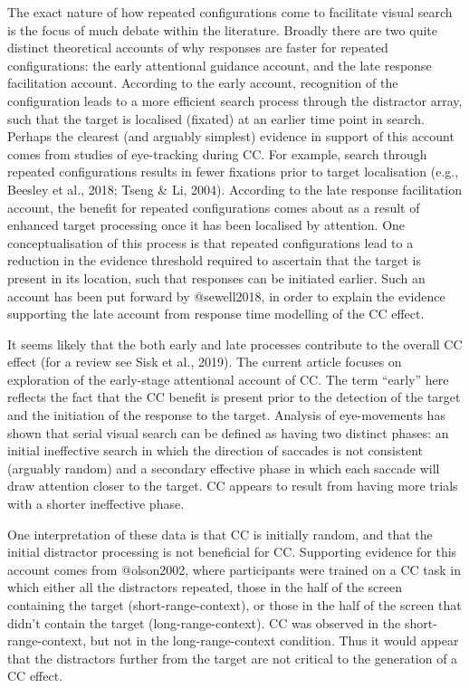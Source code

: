 \documentclass[
  man,
  floatsintext,
  longtable,
  nolmodern,
  notxfonts,
  notimes,
  colorlinks=true,linkcolor=blue,citecolor=blue,urlcolor=blue]{apa7}
\begin{document}
The exact nature of how repeated configurations come to facilitate
visual search is the focus of much debate within the literature. Broadly
there are two quite distinct theoretical accounts of why responses are
faster for repeated configurations: the early attentional guidance
account, and the late response facilitation account. According to the
early account, recognition of the configuration leads to a more
efficient search process through the distractor array, such that the
target is localised (fixated) at an earlier time point in search.
Perhaps the clearest (and arguably simplest) evidence in support of this
account comes from studies of eye-tracking during CC. For example,
search through repeated configurations results in fewer fixations prior
to target localisation (e.g., Beesley et al., 2018; Tseng \& Li, 2004).
According to the late response facilitation account, the benefit for
repeated configurations comes about as a result of enhanced target
processing once it has been localised by attention. One
conceptualisation of this process is that repeated configurations lead
to a reduction in the evidence threshold required to ascertain that the
target is present in its location, such that responses can be initiated
earlier. Such an account has been put forward by @sewell2018, in order
to explain the evidence supporting the late account from response time
modelling of the CC effect.

It seems likely that the both early and late processes contribute to the
overall CC effect (for a review see Sisk et al., 2019). The current
article focuses on exploration of the early-stage attentional account of
CC. The term ``early'' here reflects the fact that the CC benefit is
present prior to the detection of the target and the initiation of the
response to the target. Analysis of eye-movements has shown that serial
visual search can be defined as having two distinct phases: an initial
ineffective search in which the direction of saccades is not consistent
(arguably random) and a secondary effective phase in which each saccade
will draw attention closer to the target. CC appears to result from
having more trials with a shorter ineffective phase.

One interpretation of these data is that CC is initially random, and
that the initial distractor processing is not beneficial for CC.
Supporting evidence for this account comes from @olson2002, where
participants were trained on a CC task in which either all the
distractors repeated, those in the half of the screen containing the
target (short-range-context), or those in the half of the screen that
didn't contain the target (long-range-context). CC was observed in the
short-range-context, but not in the long-range-context condition. Thus
it would appear that the distractors further from the target are not
critical to the generation of a CC effect.
\end{document}
